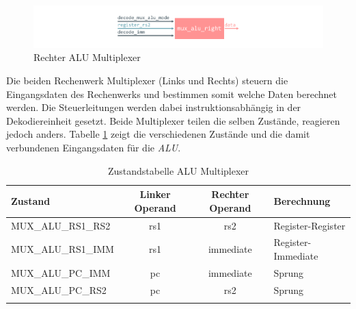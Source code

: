             \begin{figure}[H]
                \centering
                \includegraphics[scale=1]{img/block_mux_alu_right.pdf}
                \caption{Rechter ALU Multiplexer}
                \label{fig:alu_mux_right}
            \end{figure}

            Die beiden Rechenwerk Multiplexer (Links und Rechts) steuern die Eingangsdaten des Rechenwerks und bestimmen somit welche Daten
            berechnet werden. Die Steuerleitungen werden dabei instruktionsabhängig in der Dekodiereinheit gesetzt.
            Beide Multiplexer teilen die selben Zustände, reagieren jedoch anders.
            Tabelle \ref{tab:alu-mux} zeigt die verschiedenen Zustände und die damit verbundenen Eingangsdaten für die \textit{ALU}.


            \begin{center}
                \begin{longtable}{| l | c | c | l |}
                    \hline
                        Zustand & Linker Operand & Rechter Operand & Berechnung \\
                    \hline
                        MUX\_ALU\_RS1\_RS2 & rs1 & rs2 & Register-Register \\
                    \hline
                        MUX\_ALU\_RS1\_IMM & rs1 & immediate &  Register-Immediate\\
                    \hline
                        MUX\_ALU\_PC\_IMM & pc & immediate & Sprung \\
                    \hline
                        MUX\_ALU\_PC\_RS2 & pc & rs2 & Sprung \\
                    \hline
                    \caption[Zustandstabelle ALU Multiplexer]{Zustandstabelle ALU Multiplexer}
                    \label{tab:alu-mux}
                \end{longtable}
            \end{center}

            
            

